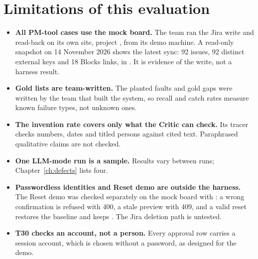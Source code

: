\chapter{Limitations of this evaluation}
\label{ch:limitations}

\begin{itemize}
  \item \textbf{All PM-tool cases use the mock board.} The team ran the Jira write and read-back on its own site, project , from its demo machine. A read-only snapshot on 14 November 2026 shows the latest sync: 92 issues, 92 distinct external keys and 18 Blocks links, in . It is evidence of the write, not a harness result.
  \item \textbf{Gold lists are team-written.} The planted faults and gold gaps were written by the team that built the system, so recall and catch rates measure known failure types, not unknown ones.
  \item \textbf{The invention rate covers only what the Critic can check.} Its tracer checks numbers, dates and titled persons against cited text. Paraphrased qualitative claims are not checked.
  \item \textbf{One LLM-mode run is a sample.} Results vary between runs; Chapter~\ref{ch:defects} lists four.
  \item \textbf{Passwordless identities and Reset demo are outside the harness.} The Reset demo was checked separately on the mock board with : a wrong confirmation is refused with 400, a stale preview with 409, and a valid reset restores the baseline and keeps . The Jira deletion path is untested.
  \item \textbf{T30 checks an account, not a person.} Every approval row carries a session account, which is chosen without a password, as designed for the demo.
\end{itemize}
